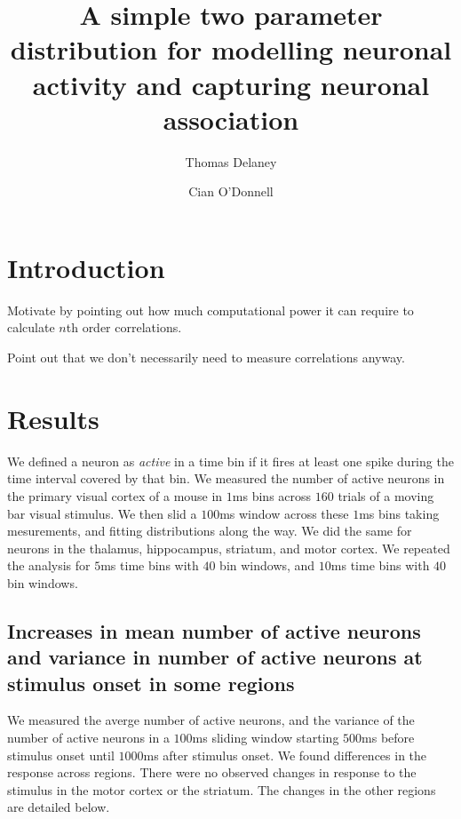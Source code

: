 \documentclass[a4paper,12pt]{article}
\title{A simple two parameter distribution for modelling neuronal activity and capturing neuronal association}
\date{}
\author[1]{Thomas Delaney}
\author[1]{Cian O'Donnell}
\affil[1]{School of Computer Science, Electrical and Electronic Engineering, and Engineering Mathematics, University of Bristol, Bristol, United Kingdom.}
\theoremstyle{definition}
\begin{document}
\maketitle



\section{Introduction}
  Motivate by pointing out how much computational power it can require to calculate $n$th order correlations.

  Point out that we don't necessarily need to measure correlations anyway.

\section{Results}
We defined a neuron as \textit{active} in a time bin if it fires at least one spike during the time interval covered by that bin. We measured the number of active neurons in the primary visual cortex of a mouse in $1$ms bins across $160$ trials of a moving bar visual stimulus. We then slid a $100$ms window across these $1$ms bins taking mesurements, and fitting distributions along the way. We did the same for neurons in the thalamus, hippocampus, striatum, and motor cortex. We repeated the analysis for $5$ms time bins with $40$ bin windows, and $10$ms time bins with $40$ bin windows.

  \subsection{Increases in mean number of active neurons and variance in number of active neurons at stimulus onset in some regions}
  We measured the averge number of active neurons, and the variance of the number of active neurons in a $100$ms sliding window starting $500$ms before stimulus onset until $1000$ms after stimulus onset. We found differences in the response across regions. There were no observed changes in response to the stimulus in the motor cortex or the striatum. The changes in the other regions are detailed below.
\end{document}
